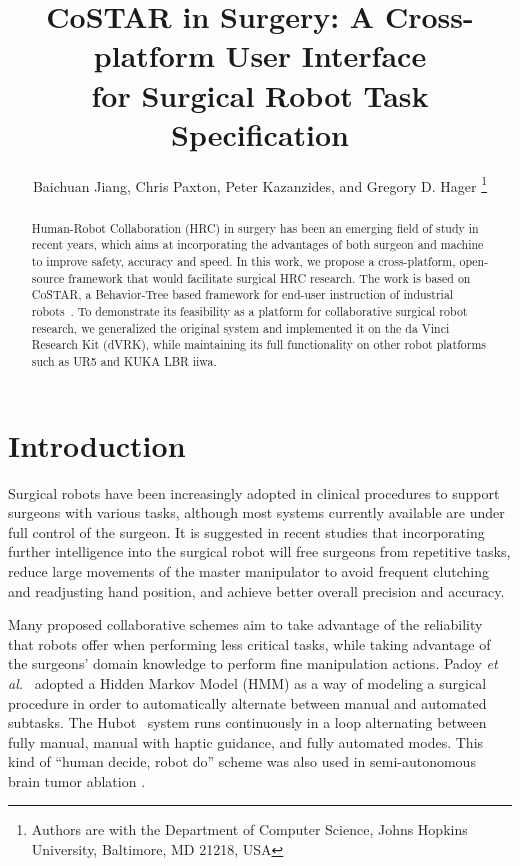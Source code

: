 \documentclass[letterpaper, 10 pt, conference]{ieeeconf}
\title{\huge \bf
CoSTAR in Surgery: A Cross-platform User Interface \\for Surgical Robot Task Specification
}
\author{Baichuan Jiang, Chris Paxton, Peter Kazanzides, and Gregory D. Hager
\thanks{Authors are with the Department of Computer Science, Johns Hopkins University,
        Baltimore, MD 21218, USA}
}
\begin{document}
\maketitle
\thispagestyle{empty}
\pagestyle{empty}


\newcommand{\fix}[1]{{\color{red} \textbf{[FIX: #1]}}}
\newcommand{\todo}[2]{{\color{blue} \textbf{[TODO(#1): #2]}}}

\begin{abstract}

Human-Robot Collaboration (HRC) in surgery has been an emerging field of study in recent years, which aims at incorporating the advantages of both surgeon and machine to improve safety, accuracy and speed. In this work, we propose a cross-platform, open-source framework that would facilitate surgical HRC research. The work is based on CoSTAR, a Behavior-Tree based framework for end-user instruction of industrial robots~\cite{paxton2017costar}. To demonstrate its feasibility as a platform for collaborative surgical robot research, we generalized the original system and implemented it on the da Vinci Research Kit (dVRK), while maintaining its full functionality on other robot platforms such as UR5 and KUKA LBR iiwa.  

\end{abstract}


\section{Introduction}

Surgical robots have been increasingly adopted in clinical procedures to support surgeons with various tasks, although most systems currently available are under full control of the surgeon. It is suggested in recent studies \cite{padoy2011human,berthet2016hubot,bauzano2016collaborative,hu2015semi} that incorporating further intelligence into the surgical robot will free surgeons from repetitive tasks, reduce large movements of the master manipulator to avoid frequent clutching and readjusting hand position, and achieve better overall precision and accuracy. 

Many proposed collaborative schemes aim to take advantage of the reliability that robots offer when performing less critical tasks, while taking advantage of the surgeons' domain knowledge to perform fine manipulation actions. Padoy \textit{et al.}~\cite{padoy2011human} adopted a Hidden Markov Model (HMM) as a way of modeling a surgical procedure in order to automatically alternate between manual and automated subtasks. The Hubot~\cite{berthet2016hubot} system runs continuously in a loop alternating between fully manual, manual with haptic guidance, and fully automated modes. This kind of ``human decide, robot do'' scheme was also used in semi-autonomous brain tumor ablation \cite{hu2015semi}.
\end{document}
